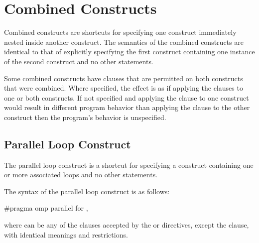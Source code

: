 %
%
\section{Combined Constructs}
\label{sec:Combined Constructs}
Combined constructs are shortcuts for specifying one construct immediately nested 
inside another construct. The semantics of the combined constructs are identical to that 
of explicitly specifying the first construct containing one instance of the second 
construct and no other statements.

Some combined constructs have clauses that are permitted on both constructs that were
combined. Where specified, the effect is as if applying the clauses to one or both
constructs. If not specified and applying the clause to one construct would result in
different program behavior than applying the clause to the other construct then the
program's behavior is unspecified.











\subsection{Parallel Loop Construct}
\label{subsec:Parallel Loop Construct}
\summary
The parallel loop construct is a shortcut for specifying a  construct 
containing one or more associated loops and no other statements.

\syntax
\ccppspecificstart
The syntax of the parallel loop construct is as follows:

\begin{boxedcode}
\#pragma omp parallel for \plc{[clause[ [},\plc{] clause] ... ] new-line}
\end{boxedcode}

where  can be any of the clauses accepted by the  or  directives, 
except the  clause, with identical meanings and restrictions.
\ccppspecificend


